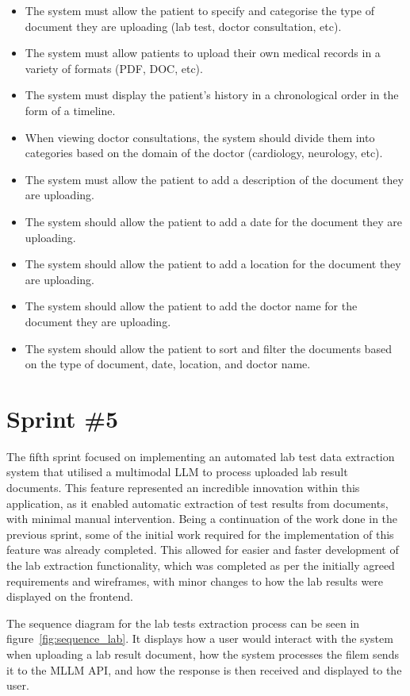 \begin{itemize}
  \item The system must allow the patient to specify and categorise the type of document they are uploading (lab test, doctor consultation, etc).
  \item The system must allow patients to upload their own medical records in a variety of formats (PDF, DOC, etc).
  \item The system must display the patient's history in a chronological order in the form of a timeline.
  \item When viewing doctor consultations, the system should divide them into categories based on the domain of the doctor (cardiology, neurology, etc).
  \item The system must allow the patient to add a description of the document they are uploading.
  \item The system should allow the patient to add a date for the document they are uploading.
  \item The system should allow the patient to add a location for the document they are uploading.
  \item The system should allow the patient to add the doctor name for the document they are uploading.
  \item The system should allow the patient to sort and filter the documents based on the type of document, date, location, and doctor name. 
\end{itemize}

\section{Sprint \#5}

The fifth sprint focused on implementing an automated lab test data extraction system that utilised a multimodal LLM to process uploaded lab result documents. This feature represented an incredible innovation within this application, as it enabled automatic extraction of test results from documents, with minimal manual intervention. Being a continuation of the work done in the previous sprint, some of the initial work required for the implementation of this feature was already completed. This allowed for easier and faster development of the lab extraction functionality, which was completed as per the initially agreed requirements and wireframes, with minor changes to how the lab results were displayed on the frontend. 

The sequence diagram for the lab tests extraction process can be seen in figure~\ref{fig:sequence_lab}. It displays how a user would interact with the system when uploading a lab result document, how the system processes the filem sends it to the MLLM API, and how the response is then received and displayed to the user.

